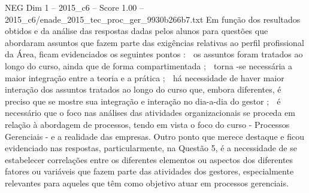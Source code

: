 \begin{textsample}{NEG Dim 1 – 2015\_c6 – Score 1.00 – 2015\_c6/enade\_2015\_tec\_proc\_ger\_9930b266b7.txt}
Em função dos resultados obtidos e da análise das respostas dadas pelos alunos para questões que abordaram assuntos que fazem parte das exigências relativas ao perfil profissional da Área, ficam evidenciados os seguintes pontos :  os assuntos foram tratados ao longo do curso, ainda que de forma compartimentada ;  torna -se necessária a maior integração entre a teoria e a prática ;  há necessidade de haver maior interação dos assuntos tratados ao longo do curso que, embora diferentes, é preciso que se mostre sua integração e interação no dia-a-dia do gestor ;  é necessário que o foco nas análises das atividades organizacionais se proceda em relação à abordagem de processos, tendo em vista o foco do curso - Processos Gerenciais - e a realidade das empresas.
Outro ponto que merece destaque e ficou evidenciado nas respostas, particularmente, na Questão 5, é a necessidade de se estabelecer correlações entre os diferentes elementos ou aspectos dos diferentes fatores ou variáveis que fazem parte das atividades dos gestores, especialmente relevantes para aqueles que têm como objetivo atuar em processos gerenciais.

\end{textsample}
